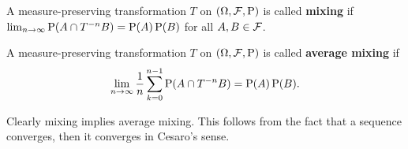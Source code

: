 \begin{definition}
    A measure-preserving transformation $T$ on $(\Omega,\F,\P)$ 
    is called \textbf{mixing} if $\lim_{n\to\infty}\P(A\cap T^{-n}B) 
    = \P(A)\P(B)$ for all $A,B\in\F$. 
\end{definition}

\begin{definition}
    A measure-preserving transformation $T$ on $(\Omega,\F,\P)$ 
    is called \textbf{average mixing} if 
    \begin{equation*}
        \lim_{n\to\infty}\frac{1}{n}\sum_{k=0}^{n-1}\P(A\cap T^{-n}B) 
        = \P(A)\P(B). 
    \end{equation*} 
\end{definition}
\begin{remark}
    Clearly mixing implies average mixing. This follows 
    from the fact that a sequence converges, then it 
    converges in Cesaro's sense.  
\end{remark}

